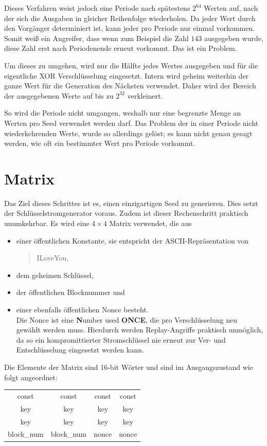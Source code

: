 \documentclass[10pt,a4paper]{article}
\begin{document}
\medskip
Dieses Verfahren weist jedoch eine Periode nach spätestens $2^{64}$ Werten auf, nach der sich die Ausgaben in gleicher Reihenfolge wiederholen.
Da jeder Wert durch den Vorgänger determiniert ist, kann jeder pro Periode nur einmal vorkommen.
Somit weiß ein Angreifer, dass wenn zum Beispiel die Zahl $143$ ausgegeben wurde, diese Zahl erst nach Periodenende erneut vorkommt.
Das ist ein Problem.

Um dieses zu umgehen, wird nur die Hälfte jedes Wertes ausgegeben und für die eigentliche XOR Verschlüsselung eingesetzt.
Intern wird geheim weiterhin der ganze Wert für die Generation des Nächsten verwendet.
Daher wird der Bereich der ausgegebenen Werte auf bis zu $2^{32}$ verkleinert.

So wird die Periode nicht umgangen, weshalb nur eine begrenzte Menge an Werten pro Seed verwendet werden darf.
Das Problem der in einer Periode nicht wiederkehrenden Werte, wurde so allerdings gelöst; es kann nicht genau gesagt werden, wie oft ein bestimmter Wert pro Periode vorkommt.

\section{Matrix}

Das Ziel dieses Schrittes ist es, einen einzigartigen Seed zu generieren.
Dies setzt der Schlüsselstromgenerator voraus.
Zudem ist dieser Rechenschritt praktisch unumkehrbar.
Es wird eine $4 \times 4$ Matrix verwendet, die aus
\begin{itemize}
    \item einer öffentlichen Konstante, sie entspricht der ASCII-Repräsentation von
          \begin{quotation}
              \glqq ILoveYou\grqq{},
          \end{quotation}
    \item dem geheimen Schlüssel,
    \item der öffentlichen Blocknummer und
    \item einer ebenfalls öffentlichen Nonce besteht. \\
          Die Nonce ist eine \glqq \textbf{N}umber used \textbf{ONCE}\grqq{}, die pro Verschlüsselung neu gewählt werden muss.
          Hierdurch werden Replay-Angriffe praktisch unmöglich, da so ein kompromittierter Stromschlüssel nie erneut zur Ver- und Entschlüsselung eingesetzt werden kann.
\end{itemize}

Die Elemente der Matrix sind 16-bit Wörter und sind im Ausgangszustand wie folgt angeordnet:
\begin{center}
    \begin{tabular}{ c c c c }
        const      & const      & const & const \\
        key        & key        & key   & key   \\
        key        & key        & key   & key   \\
        block\_num & block\_num & nonce & nonce \\
    \end{tabular}
\end{center}
\end{document}
